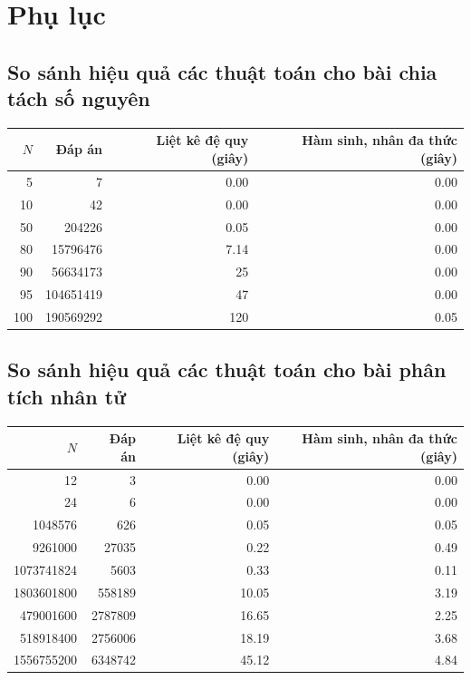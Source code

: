 \documentclass[11pt]{article}
\begin{document}
\appendix
\section{Phụ lục}

\subsection*{So sánh hiệu quả các thuật toán cho bài chia tách số nguyên}

\begin{center}
\begin{tabular}{r r r r}
\hline
\(N\) & Đáp án & Liệt kê đệ quy (giây) & Hàm sinh, nhân đa thức (giây)\\
\hline
5 & 7 & 0.00 & 0.00\\
10 & 42 & 0.00 & 0.00\\
50 & 204226 & 0.05 & 0.00\\
80 & 15796476 & 7.14 & 0.00\\
90 & 56634173 & 25 & 0.00\\
95 & 104651419 & 47 & 0.00\\
100 & 190569292 & 120 & 0.05\\
\hline
\end{tabular}
\end{center}

\subsection*{So sánh hiệu quả các thuật toán cho bài phân tích nhân tử}

\begin{center}
\begin{tabular}{r r r r}
\hline
\(N\) & Đáp án & Liệt kê đệ quy (giây) & Hàm sinh, nhân đa thức (giây)\\
\hline
12 & 3 & 0.00 & 0.00\\
24 & 6 & 0.00 & 0.00\\
1048576 & 626 & 0.05 & 0.05\\
9261000 & 27035 & 0.22 & 0.49\\
1073741824 & 5603 & 0.33 & 0.11\\
1803601800 & 558189 & 10.05 & 3.19\\
479001600 & 2787809 & 16.65 & 2.25\\
518918400 & 2756006 & 18.19 & 3.68\\
1556755200 & 6348742 & 45.12 & 4.84\\
\hline
\end{tabular}
\end{center}
\end{document}
